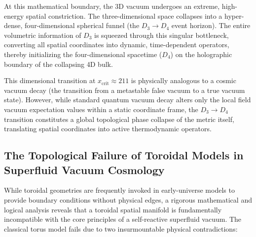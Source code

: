 \documentclass[11pt,a4paper]{article}
\theoremstyle{plain}
\theoremstyle{definition}
\theoremstyle{remark}
\begin{document}
At this mathematical boundary, the 3D vacuum undergoes an extreme, high-energy spatial constriction. The three-dimensional space collapses into a hyper-dense, four-dimensional spherical funnel (the $D_3 \to D_4$ event horizon). The entire volumetric information of $D_3$ is squeezed through this singular bottleneck, converting all spatial coordinates into dynamic, time-dependent operators, thereby initializing the four-dimensional spacetime ($D_4$) on the holographic boundary of the collapsing 4D bulk.


This dimensional transition at $x_{\text{crit}} \approx 211$ is physically analogous to a cosmic vacuum decay (the transition from a metastable false vacuum to a true vacuum state). However, while standard quantum vacuum decay alters only the local field vacuum expectation values within a static coordinate frame, the $D_3 \to D_4$ transition constitutes a global topological phase collapse of the metric itself, translating spatial coordinates into active thermodynamic operators.

\subsection{The Topological Failure of Toroidal Models in Superfluid Vacuum Cosmology}
While toroidal geometries are frequently invoked in early-universe models to provide boundary conditions without physical edges, a rigorous mathematical and logical analysis reveals that a toroidal spatial manifold is fundamentally incompatible with the core principles of a self-reactive superfluid vacuum. The classical torus model fails due to two insurmountable physical contradictions:
\end{document}
